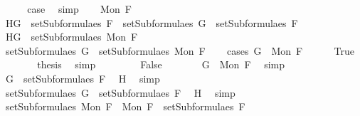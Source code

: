 \begin{isabellebody}
\ \ \isamarkupfalse%
\ \isamarkupfalse%
\ {\isacharquery}case\ \isamarkupfalse%
\ simp\isanewline
{}\isamarkupfalse%
\isanewline
\ \ \isamarkupfalse%
\ {\isacharparenleft}Mon\ F{\isacharparenright}\isanewline
\ \ \isamarkupfalse%
\ H{}{\isacharcolon}{\isachardoublequoteopen}G\ {\isasymin}\ setSubformulae{\isacharunderscore}s\ F\ {\isasymLongrightarrow}\ setSubformulae{\isacharunderscore}s\ G\ {\isasymsubseteq}\ setSubformulae{\isacharunderscore}s\ F{\isachardoublequoteclose}\isanewline
\ \ \isamarkupfalse%
\ H{}{\isacharcolon}{\isachardoublequoteopen}G\ {\isasymin}\ setSubformulae{\isacharunderscore}s\ {\isacharparenleft}Mon\ F{\isacharparenright}{\isachardoublequoteclose}\isanewline
\ \ \isamarkupfalse%
\ \isamarkupfalse%
\ {\isachardoublequoteopen}setSubformulae{\isacharunderscore}s\ G\ {\isasymsubseteq}\ setSubformulae{\isacharunderscore}s\ {\isacharparenleft}Mon\ F{\isacharparenright}{\isachardoublequoteclose}\isanewline
\ \ \isamarkupfalse%
\ {\isacharparenleft}cases\ {\isachardoublequoteopen}G\ {\isacharequal}\ Mon\ F{\isachardoublequoteclose}{\isacharparenright}\isanewline
\ \ \ \ \isamarkupfalse%
\ True\isanewline
\ \ \ \ \isamarkupfalse%
\ \isamarkupfalse%
\ {\isacharquery}thesis\ \isamarkupfalse%
\ simp\isanewline
\ \ \isamarkupfalse%
\isanewline
\ \ \ \ \isamarkupfalse%
\ False\isanewline
\ \ \ \ \isamarkupfalse%
\ \isamarkupfalse%
\ {\isachardoublequoteopen}G\ {\isasymnoteq}\ Mon\ F{\isachardoublequoteclose}\ \isamarkupfalse%
\ simp\isanewline
\ \ \ \ \isamarkupfalse%
\ \isamarkupfalse%
\ {\isachardoublequoteopen}G\ {\isasymin}\ setSubformulae{\isacharunderscore}s\ F{\isachardoublequoteclose}\ \isamarkupfalse%
\ H{}\ \isamarkupfalse%
\ simp\isanewline
\ \ \ \ \isamarkupfalse%
\ \isamarkupfalse%
\ {}{\isacharcolon}{\isachardoublequoteopen}setSubformulae{\isacharunderscore}s\ G\ {\isasymsubseteq}\ setSubformulae{\isacharunderscore}s\ F{\isachardoublequoteclose}\ \isamarkupfalse%
\ H{}\ \isamarkupfalse%
\ simp\isanewline
\ \ \ \ \isamarkupfalse%
\ {\isachardoublequoteopen}setSubformulae{\isacharunderscore}s\ {\isacharparenleft}Mon\ F{\isacharparenright}\ {\isacharequal}\ {\isacharbraceleft}Mon\ F{\isacharbraceright}\ {\isasymunion}\ setSubformulae{\isacharunderscore}s\ F{\isachardoublequoteclose}\ \isamarkupfalse%

\end{isabellebody}
